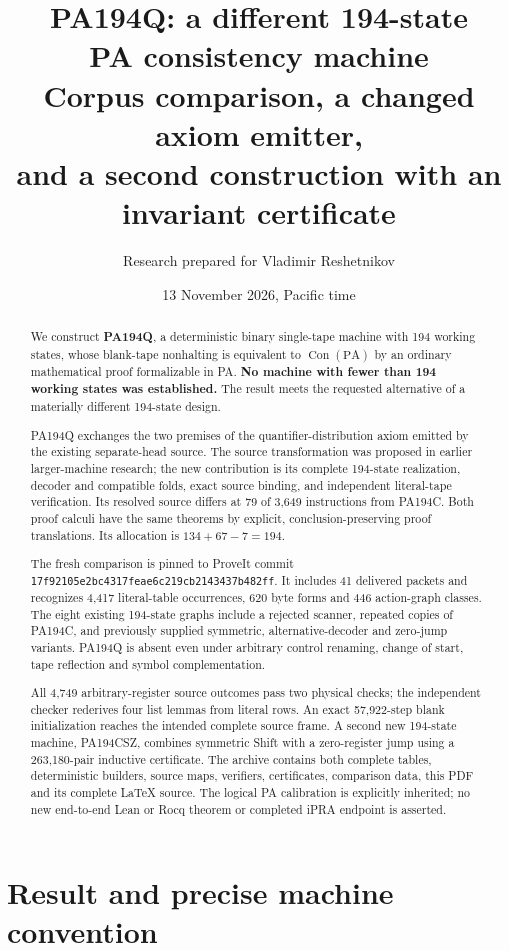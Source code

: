 \documentclass[11pt,letterpaper]{article}
\title{PA194Q: a different 194-state\\PA consistency machine\\[0.45em]
\large Corpus comparison, a changed axiom emitter,\\and a second construction with an invariant certificate}
\author{Research prepared for Vladimir Reshetnikov}
\date{13 November 2026, Pacific time}
\newcommand{\PA}{\mathrm{PA}}
\newcommand{\Con}{\operatorname{Con}}
\begin{document}
\maketitle
\begin{abstract}
We construct \textbf{PA194Q}, a deterministic binary single-tape machine
with 194 working states, whose blank-tape nonhalting is equivalent to
$\Con(\PA)$ by an ordinary mathematical proof formalizable in PA.
\textbf{No machine with fewer than 194 working states was established.}
The result meets the requested alternative of a materially different
194-state design.

PA194Q exchanges the two premises of the quantifier-distribution axiom
emitted by the existing separate-head source. The source transformation
was proposed in earlier larger-machine research; the new contribution is
its complete 194-state realization, decoder and compatible folds, exact
source binding, and independent literal-tape verification. Its resolved
source differs at 79 of 3,649 instructions from PA194C. Both proof calculi
have the same theorems by explicit, conclusion-preserving proof
translations. Its allocation is $134+67-7=194$.

The fresh comparison is pinned to ProveIt commit
\nolinkurl{17f92105e2bc4317feae6c219cb2143437b482ff}.
It includes 41 delivered packets and recognizes 4,417 literal-table
occurrences, 620 byte forms and 446 action-graph classes. The eight existing
194-state graphs include a rejected scanner, repeated copies of PA194C,
and previously supplied symmetric, alternative-decoder and zero-jump
variants. PA194Q is absent even under arbitrary control renaming, change
of start, tape reflection and symbol complementation.

All 4,749 arbitrary-register source outcomes pass two physical checks;
the independent checker rederives four list lemmas from literal rows.
An exact 57,922-step blank initialization reaches the intended complete
source frame. A second new 194-state machine, PA194CSZ, combines symmetric
Shift with a zero-register jump using a 263,180-pair inductive certificate.
The archive contains both complete tables, deterministic builders, source
maps, verifiers, certificates, comparison data, this PDF and its complete
LaTeX source. The logical PA calibration is explicitly inherited; no new
end-to-end Lean or Rocq theorem or completed iPRA endpoint is asserted.
\end{abstract}
\clearpage\tableofcontents\clearpage

\section{Result and precise machine convention}
\end{document}
